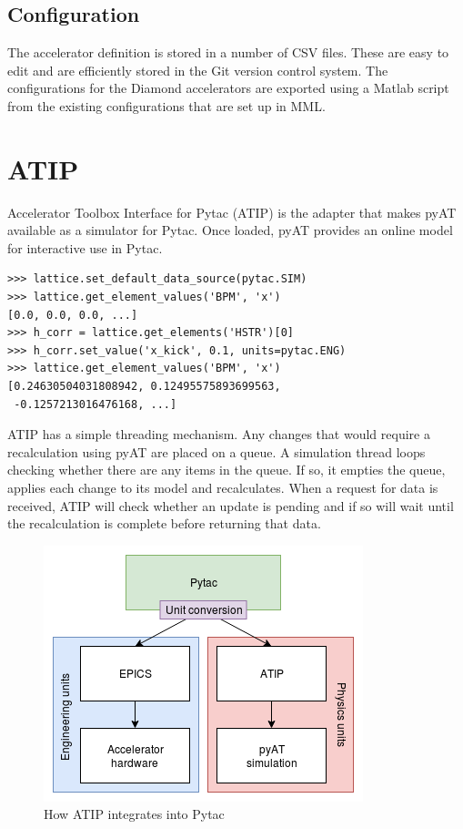 \documentclass[a4paper,
               keeplastbox,   %
               ]{jacow}
\begin{document}
\subsection{Configuration}

The accelerator definition is stored in a number of CSV files. These are easy
to edit and are efficiently stored in the Git version control system. The
configurations for the Diamond accelerators are exported using a Matlab script
from the existing configurations that are set up in MML.

\section{ATIP}

Accelerator Toolbox Interface for Pytac (ATIP) is the adapter that makes pyAT
available as a simulator for Pytac. Once loaded, pyAT provides an online model
for interactive use in Pytac.

\begin{lstlisting}
>>> lattice.set_default_data_source(pytac.SIM)
>>> lattice.get_element_values('BPM', 'x')
[0.0, 0.0, 0.0, ...]
>>> h_corr = lattice.get_elements('HSTR')[0]
>>> h_corr.set_value('x_kick', 0.1, units=pytac.ENG)
>>> lattice.get_element_values('BPM', 'x')
[0.24630504031808942, 0.12495575893699563, 
 -0.1257213016476168, ...]
\end{lstlisting}

ATIP has a simple threading mechanism. Any changes that would require a recalculation
using pyAT are placed on a queue. A simulation thread loops checking whether there
are any items in the queue. If so, it empties the queue, applies each change to its
model and recalculates. When a request for data is received, ATIP will check whether
an update is pending and if so will wait until the recalculation is complete before
returning that data.

\begin{figure}[!hbt]
    \centering
    \includegraphics*[width=\columnwidth]{atip}

    \caption{How ATIP integrates into Pytac}
    \label{fig:atip}
\end{figure}
\end{document}
